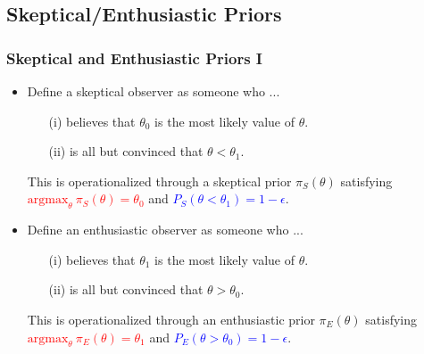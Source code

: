 \documentclass{beamer}
\begin{document}
\subsection{Skeptical/Enthusiastic Priors}
\begin{frame} \frametitle{Skeptical and Enthusiastic Priors I}
	\begin{itemize}
		\item Define a skeptical observer as someone who ...
					\begin{enumerate}
					  \vspace{0.30cm}
						\item[(i)] 		believes that $\theta_0$ is the most likely value of $\theta$.
													
						\vspace{0.30cm}							
						\item[(ii)] 	is all but convinced that $\theta < \theta_1$.		
											
					\end{enumerate}
					
		\vspace{0.30cm}	
		      This is operationalized through a skeptical prior $\pi_{S}(\theta)$ satisfying 
					\textcolor{red}{$\text{argmax}_\theta~\pi_S(\theta)=\theta_0$}  and \textcolor{blue}{$P_S(\theta <\theta_1)=1-\epsilon$}.
					
		\vspace{0.30cm}			
		\item Define an enthusiastic observer as someone who ...
					\begin{enumerate}
					  \vspace{0.30cm}
						\item[(i)] 		believes that $\theta_1$ is the most likely value of $\theta$.
													
						\vspace{0.30cm}							
						\item[(ii)] 	is all but convinced that $\theta > \theta_0$.		
													
					\end{enumerate}	
						
					\vspace{0.30cm}	
		      This is operationalized through an enthusiastic prior $\pi_{E}(\theta)$ satisfying 
					\textcolor{red}{$\text{argmax}_\theta~\pi_E(\theta)=\theta_1$} and \textcolor{blue}{$P_E(\theta >\theta_0)=1-\epsilon$}.									
									
	\end{itemize}
\end{frame}
\end{document}
